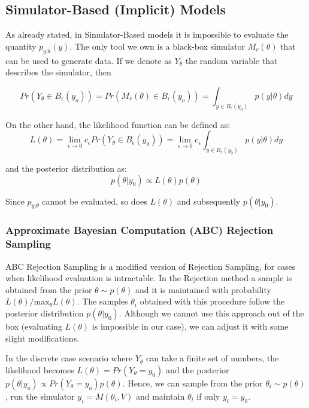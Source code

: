 \subsection{Simulator-Based (Implicit) Models}

As already stated, in Simulator-Based models it is impossible to evaluate the quantity $p_{y|\theta}(y)$. The only tool we own is a black-box simulator $M_r(\theta)$ that can be used to generate data. If we denote as $Y_\theta$ the random variable that describes the simulator, then

\begin{equation} 
  Pr(Y_\theta \in B_\epsilon(y_o)) = Pr(M_r(\theta) \in B_\epsilon(y_o)) = \int_{y \in B_\epsilon(y_0)} p(y|\theta)dy
  \end{equation}

  On the other hand, the likelihood function can be defined as:
\begin{equation} \label{eq:likelihood}
  L(\theta) =  \lim_{\epsilon \to 0} c_\epsilon Pr(Y_\theta \in B_\epsilon(y_0)) = \lim_{\epsilon \to 0} c_\epsilon \int_{y \in B_\epsilon(y_0)} p(y|\theta)dy
\end{equation}

and the posterior distribution as:
\begin{equation}
p(\theta|y_0) \propto L(\theta)p(\theta)
\end{equation}

Since $p_{y|\theta}$ cannot be evaluated, so does $L(\theta)$ and subsequently $p(\theta|y_0)$.

\subsubsection{Approximate Bayesian Computation (ABC) Rejection Sampling}

ABC Rejection Sampling is a modified version of Rejection Sampling, for cases when likelihood evaluation is intractable. In the Rejection  method a sample is obtained from the prior $\theta \sim p(\theta)$ and it is maintained with probability $L(\theta)/\text{max}_\theta L(\theta)$. The samples $\theta_i$ obtained with this procedure follow the posterior distribution $p(\theta|y_0)$. Although we cannot use this approach out of the box (evaluating $L(\theta)$ is impossible in our case), we can adjust it with some slight modifications.

In the discrete case scenario where $Y_\theta$ can take a finite set of numbers, the likelihood becomes $L(\theta) = Pr(Y_\theta=y_0)$ and the posterior $p(\theta|y_o) \propto Pr(Y_\theta=y_o)p(\theta)$. Hence, we can sample from the prior $\theta_i \sim p(\theta)$, run the simulator $y_i = M(\theta_i, V)$ and maintain $\theta_i$ if only $y_i = y_0$.

